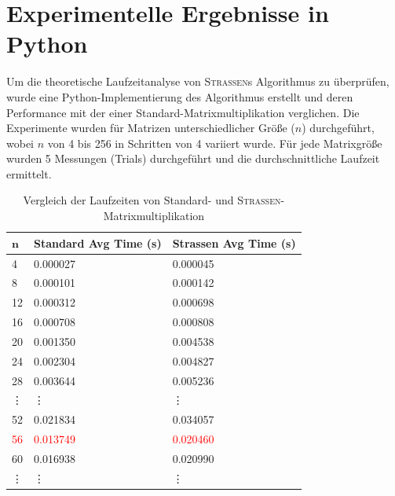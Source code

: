 \documentclass{scrartcl}
\begin{document}
\section{Experimentelle Ergebnisse in Python}
Um die theoretische Laufzeitanalyse von \textsc{Strassen}s Algorithmus zu überprüfen, wurde eine Python-Implementierung des Algorithmus erstellt und deren Performance mit der einer Standard-Matrixmultiplikation verglichen. Die Experimente wurden für Matrizen unterschiedlicher Größe ($n$) durchgeführt, wobei $n$ von 4 bis 256 in Schritten von 4 variiert wurde. Für jede Matrixgröße wurden 5 Messungen (Trials) durchgeführt und die durchschnittliche Laufzeit ermittelt.
\begin{table}[h!]
	\centering
	\caption{Vergleich der Laufzeiten von Standard- und \textsc{Strassen}-Matrixmultiplikation}
	\label{tab:strassen_results}
	\begin{tabularx}{\textwidth}{l | X | X}
		\toprule\midrule[\heavyrulewidth]
		$\mathbf{n}$ & \textbf{Standard Avg Time (s)} & \textbf{Strassen Avg Time (s)} \\
		\midrule
		4 & 0.000027 & 0.000045 \\
		8 & 0.000101 & 0.000142 \\
		12 & 0.000312 & 0.000698 \\
		16 & 0.000708 & 0.000808 \\
		20 & 0.001350 & 0.004538 \\
		24 & 0.002304 & 0.004827 \\
		28 & 0.003644 & 0.005236 \\
		\vdots & \vdots & \vdots \\
		52 & 0.021834 & 0.034057 \\
		\textcolor{red}{56} & \textcolor{red}{0.013749} & \textcolor{red}{0.020460} \\
		60 & 0.016938 & 0.020990 \\
		\vdots & \vdots & \vdots \\

\end{tabularx}
\end{table}
\end{document}
